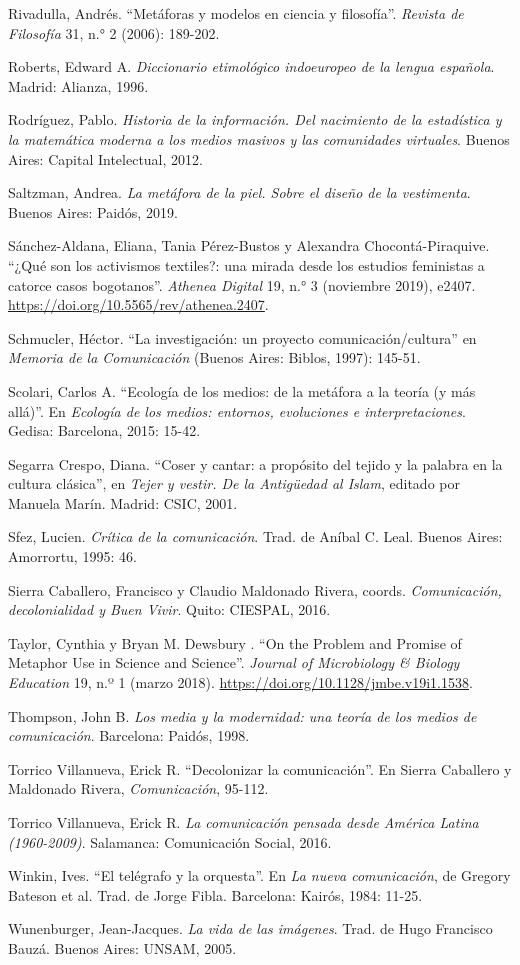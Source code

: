 \documentclass{tufte-handout}
\begin{document}
\begin{hangparas}{.25in}{1}
\enlargethispage{\baselineskip}

Rivadulla, Andrés. ``Metáforas y modelos en ciencia y filosofía''.
\emph{Revista de Filosofía} 31, n.° 2 (2006): 189-202.

Roberts, Edward A. \emph{Diccionario etimológico indoeuropeo de la
lengua española}. Madrid: Alianza, 1996.

Rodríguez, Pablo. \emph{Historia de la información. Del nacimiento de la
estadística y la matemática moderna a los medios masivos y las
comunidades virtuales}. Buenos Aires: Capital Intelectual, 2012.

Saltzman, Andrea. \emph{La metáfora de la piel. Sobre el diseño de la
vestimenta}. Buenos Aires: Paidós, 2019.

Sánchez-Aldana, Eliana, Tania Pérez-Bustos y Alexandra
Chocontá-Piraquive. ``¿Qué son los activismos textiles?: una mirada
desde los estudios feministas a catorce casos bogotanos''. \emph{Athenea
Digital} 19, n.° 3 (noviembre 2019), e2407.
\url{https://doi.org/10.5565/rev/athenea.2407}.

Schmucler, Héctor. ``La investigación: un proyecto
comunicación/cultura'' en \emph{Memoria de la Comunicación} (Buenos
Aires: Biblos, 1997): 145-51.

Scolari, Carlos A. ``Ecología de los medios: de la metáfora a la teoría
(y más allá)''. En \emph{Ecología de los medios: entornos, evoluciones e
interpretaciones}. Gedisa: Barcelona, 2015: 15-42.

Segarra Crespo, Diana. ``Coser y cantar: a propósito del tejido y la
palabra en la cultura clásica'', en \emph{Tejer y vestir. De la
Antigüedad al Islam}, editado por Manuela Marín. Madrid: CSIC, 2001.

Sfez, Lucien. \emph{Crítica de la comunicación}. Trad. de Aníbal C.
Leal. Buenos Aires: Amorrortu, 1995: 46.

Sierra Caballero, Francisco y Claudio Maldonado Rivera, coords.
\emph{Comunicación, decolonialidad y Buen Vivir}. Quito: CIESPAL, 2016.

Taylor, Cynthia y Bryan M. Dewsbury . ``On the Problem and Promise of
Metaphor Use in Science and Science''. \emph{Journal of Microbiology \&
Biology Education} 19, n.º 1 (marzo 2018).
\url{https://doi.org/10.1128/jmbe.v19i1.1538}.

Thompson, John B. \emph{Los media y la modernidad: una teoría de los
medios de comunicación}. Barcelona: Paidós, 1998.

Torrico Villanueva, Erick R. ``Decolonizar la comunicación''. En Sierra
Caballero y Maldonado Rivera, \emph{Comunicación}, 95-112.

Torrico Villanueva, Erick R. \emph{La comunicación pensada desde América
Latina (1960-2009)}. Salamanca: Comunicación Social, 2016.

\pagebreak Winkin, Ives. ``El telégrafo y la orquesta''. En \emph{La nueva
comunicación}, de Gregory Bateson et al. Trad. de Jorge Fibla.
Barcelona: Kairós, 1984: 11-25.

Wunenburger, Jean-Jacques. \emph{La vida de las imágenes}. Trad. de Hugo
Francisco Bauzá. Buenos Aires: UNSAM, 2005.



\end{hangparas}
\end{document}
